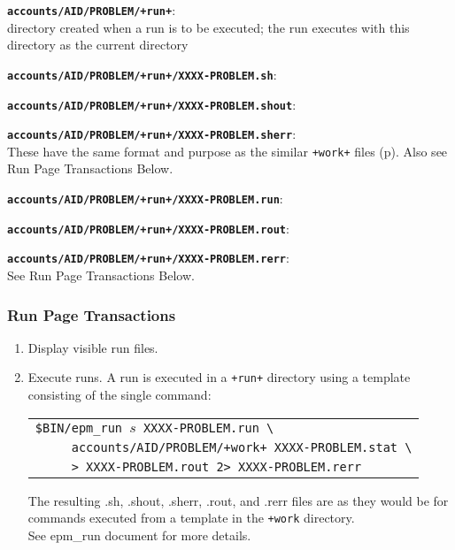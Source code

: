 \documentclass[12pt]{article}
\newenvironment{indpar}[1][0.4in]%
	{\begin{list}{}%
		     {\setlength{\itemsep}{0in}%
		      \setlength{\topsep}{0in}%
		      \setlength{\parsep}{1ex}%
		      \setlength{\labelwidth}{#1}%
		      \setlength{\leftmargin}{#1}%
		      \addtolength{\leftmargin}{\labelsep}}%
	 \item}%
	{\end{list}}
\newenvironment{itemlist}[1][0.2in]%
	{\begin{list}{}{\setlength{\labelwidth}{#1}%
		        \setlength{\leftmargin}{\labelwidth}%
		        \addtolength{\leftmargin}{+0.2in}%
		        \addtolength{\linewidth}{-\labelwidth}%
		        \addtolength{\linewidth}{-0.2in}%
		        \renewcommand{\makelabel}[1]{##1\hfill}}
	 \raggedright}%
	{\end{list}}
\newcommand{\TT}[1]{{\tt \bfseries #1}}
\newcommand{\pagref}[1]{p\pageref{#1}}
\newcommand{\BSL}{\textbackslash}
\begin{document}
\begin{indpar}
\begin{itemlist}
\item[\TT{accounts/AID/PROBLEM/+run+}:]~
\label{PROBLEM/RUN} \\
    directory created when a run is to be executed;
    the run executes with this directory as the current
    directory
\item[\TT{accounts/AID/PROBLEM/+run+/XXXX-PROBLEM.sh}:]
\item[\TT{accounts/AID/PROBLEM/+run+/XXXX-PROBLEM.shout}:]\vspace*{-1ex}
\item[\TT{accounts/AID/PROBLEM/+run+/XXXX-PROBLEM.sherr}:]\vspace*{-1ex} ~ \\
These have the same format and purpose as the similar {\tt +work+}
files (\pagref{PROBLEM/WORK}).  Also see Run Page Transactions Below.

\item[\TT{accounts/AID/PROBLEM/+run+/XXXX-PROBLEM.run}:]
\item[\TT{accounts/AID/PROBLEM/+run+/XXXX-PROBLEM.rout}:]\vspace*{-1ex}
\item[\TT{accounts/AID/PROBLEM/+run+/XXXX-PROBLEM.rerr}:]\vspace*{-1ex} ~ \\
See Run Page Transactions Below.

\end{itemlist}
\end{indpar}

\subsubsection{Run Page Transactions}

\begin{enumerate}
\item Display visible run files.
\item Execute runs.  A run is executed in a {\tt +run+}
      directory using a template consisting of the single
      command:
      \begin{center}
      \begin{tabular}{l}
      \tt \$BIN/epm\_run $s$ XXXX-PROBLEM.run \BSL \\
      \tt ~~~~ accounts/AID/PROBLEM/+work+ XXXX-PROBLEM.stat \BSL \\
      \tt ~~~~ > XXXX-PROBLEM.rout 2> XXXX-PROBLEM.rerr
      \end{tabular}
      \end{center}
      The resulting .sh, .shout, .sherr, .rout, and .rerr
      files are as they would be for commands executed from
      a template in the {\tt +work} directory.
      \\[1ex]
      See epm\_run document for more details.

\end{enumerate}
\end{document}
